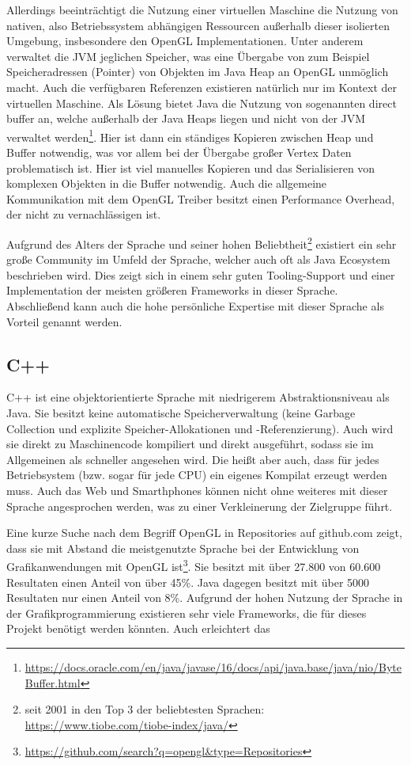 Allerdings beeinträchtigt die Nutzung einer virtuellen Maschine die Nutzung von nativen, also Betriebssystem abhängigen Ressourcen außerhalb dieser isolierten Umgebung, insbesondere den OpenGL Implementationen. Unter anderem verwaltet die JVM jeglichen Speicher, was eine Übergabe von zum Beispiel Speicheradressen (Pointer) von Objekten im Java Heap an OpenGL unmöglich macht. Auch die verfügbaren Referenzen existieren natürlich nur im Kontext der virtuellen Maschine. Als Lösung bietet Java die Nutzung von sogenannten direct buffer an, welche außerhalb der Java Heaps liegen und nicht von der JVM verwaltet werden\footnote{\url{https://docs.oracle.com/en/java/javase/16/docs/api/java.base/java/nio/ByteBuffer.html}}. Hier ist dann ein ständiges Kopieren zwischen Heap und Buffer notwendig, was vor allem bei der Übergabe großer Vertex Daten problematisch ist. Hier ist viel manuelles Kopieren und das Serialisieren von komplexen Objekten in die Buffer notwendig. Auch die allgemeine Kommunikation mit dem OpenGL Treiber besitzt einen Performance Overhead, der nicht zu vernachlässigen ist.

Aufgrund des Alters der Sprache und seiner hohen Beliebtheit\footnote{seit 2001 in den Top 3 der beliebtesten Sprachen: \url{https://www.tiobe.com/tiobe-index/java/}} existiert ein sehr große Community im Umfeld der Sprache, welcher auch oft als Java Ecosystem beschrieben wird. Dies zeigt sich in einem sehr guten Tooling-Support und einer Implementation der meisten größeren Frameworks in dieser Sprache. Abschließend kann auch die hohe persönliche Expertise mit dieser Sprache als Vorteil genannt werden.

\subsection{C++}
C++ ist eine objektorientierte Sprache mit niedrigerem Abstraktionsniveau als Java. Sie besitzt keine automatische Speicherverwaltung (keine Garbage Collection und explizite Speicher-Allokationen und -Referenzierung). Auch wird sie direkt zu Maschinencode kompiliert und direkt ausgeführt, sodass sie im Allgemeinen als schneller angesehen wird. Die heißt aber auch, dass für jedes Betriebsystem (bzw. sogar für jede CPU) ein eigenes Kompilat erzeugt werden muss. Auch das Web und Smarthphones können nicht ohne weiteres mit dieser Sprache angesprochen werden, was zu einer Verkleinerung der Zielgruppe führt.

Eine kurze Suche nach dem Begriff OpenGL in Repositories auf github.com zeigt, dass sie mit Abstand die meistgenutzte Sprache bei der Entwicklung von Grafikanwendungen mit OpenGL ist\footnote{\url{https://github.com/search?q=opengl&type=Repositories}}. Sie besitzt mit über 27.800 von 60.600 Resultaten einen Anteil von über 45\%. Java dagegen besitzt mit über 5000 Resultaten nur einen Anteil von 8\%. Aufgrund der hohen Nutzung der Sprache in der Grafikprogrammierung existieren sehr viele Frameworks, die für dieses Projekt benötigt werden könnten. Auch erleichtert das 

